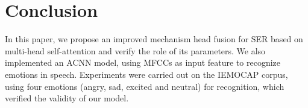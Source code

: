 \documentclass[10pt, conference, compsocconf]{IEEEtran}
\begin{document}
\section{Conclusion}
In this paper, we propose an improved mechanism head fusion for SER based on multi-head self-attention and verify the role of its parameters. We also implemented an ACNN model, using MFCCs as input feature to recognize emotions in speech. Experiments were carried out on the IEMOCAP corpus, using four emotions (angry, sad, excited and neutral) for recognition, which verified the validity of our model.



%
%




%
%
%
%
%


%
%



\end{document}
